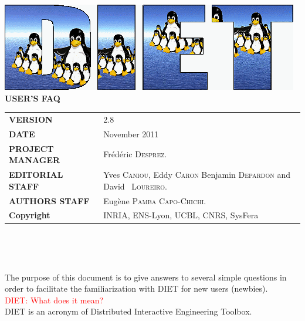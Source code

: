 \documentclass[12pt,a4paper]{book}
\newcommand{\dietversion}{2.8}
\begin{document}

\thispagestyle{empty}
\vspace*{3cm}
\vspace*{3cm}

\begin{center}
\includegraphics[scale=.5]{fig/logo_DIET_big}\\[2ex]
\textbf{\Huge USER'S FAQ\\[2ex]}
\end{center}

\vfill

\noindent
\small{
\begin{tabular}{ll}
  \textbf{VERSION}  & \dietversion\\
  \textbf{DATE}     & November 2011\\
  \textbf{PROJECT MANAGER}  & Fr\'ed\'eric \textsc{Desprez}.\\
  \textbf{EDITORIAL STAFF}  & Yves \textsc{Caniou}, Eddy
  \textsc{Caron} Benjamin \textsc{Depardon} and David ~\textsc{Loureiro}.\\
  \textbf{AUTHORS STAFF}    & 
\begin{minipage}[t]{12cm}
  Eug\`ene \textsc{Pamba Capo-Chichi}.
\end{minipage} \\
  \textbf{Copyright}& INRIA, ENS-Lyon, UCBL, CNRS, SysFera
\end{tabular}\\
}

\newpage
\thispagestyle{empty}
\ 



\newpage
\tableofcontents

\setlength{\columnseprule}{1pt}


\noindent The purpose of this document is to give answers to several simple questions in order to facilitate the familiarization with DIET for new users (newbies).\\

\noindent \textcolor{red}{DIET: What does it mean?}\\
DIET is an acronym of Distributed Interactive Engineering Toolbox.\\
\end{document}
